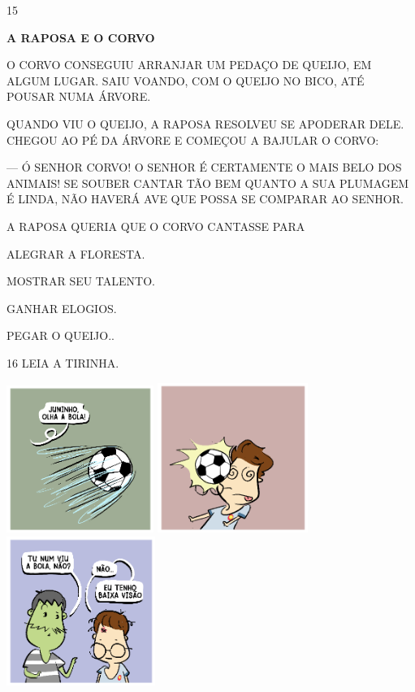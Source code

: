 
\num{15}

\textbf{A RAPOSA E O CORVO}

O CORVO CONSEGUIU ARRANJAR UM PEDAÇO DE QUEIJO, EM ALGUM
LUGAR. SAIU VOANDO, COM O QUEIJO NO BICO, ATÉ POUSAR NUMA
ÁRVORE.

QUANDO VIU O QUEIJO, A RAPOSA RESOLVEU SE APODERAR
DELE. CHEGOU AO PÉ DA ÁRVORE E COMEÇOU A BAJULAR O CORVO:

--- Ó SENHOR CORVO! O SENHOR É CERTAMENTE O MAIS BELO
DOS ANIMAIS! SE SOUBER CANTAR TÃO BEM QUANTO A SUA PLUMAGEM
É LINDA, NÃO HAVERÁ AVE QUE POSSA SE COMPARAR AO SENHOR.


A RAPOSA QUERIA QUE O CORVO CANTASSE PARA

\begin{escolha}
\item ALEGRAR A FLORESTA.

\item MOSTRAR SEU TALENTO.

\item GANHAR ELOGIOS.

\item PEGAR O QUEIJO..
\end{escolha}



\num{16} LEIA A TIRINHA.

\includegraphics[width=1.88542in,height=1.88542in]{media/image236.png}
\includegraphics[width=1.92708in,height=1.92708in]{media/image237.png}
\includegraphics[width=1.90625in,height=1.90625in]{media/image238.png}

